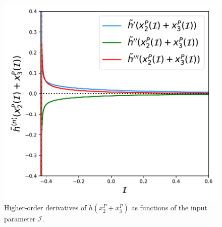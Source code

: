 \begin{figure}[H]
    \centering
    \includegraphics[scale=0.5]{figs/numerics/fibo_x2r_case4_h_derivative.pdf}
    \caption{Higher-order derivatives of $\tilde{h}(x_2^P + x_3^P)$ as functions of the input 
    parameter $\mathcal{I}$.}
    \label{fig:case4-fibo-hderivative}
\end{figure}